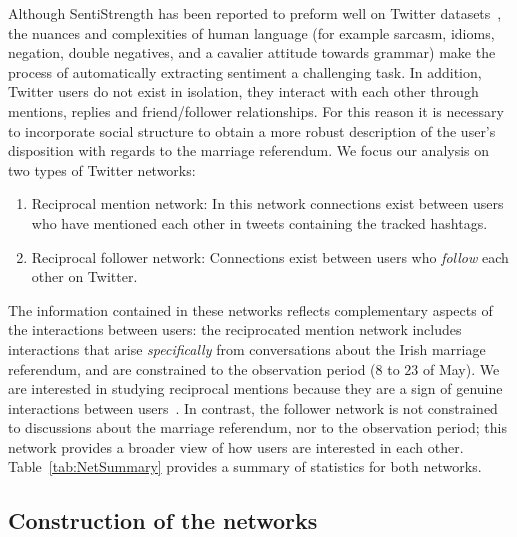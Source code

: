 \documentclass{article}
\begin{document}
Although SentiStrength has been reported to preform well on Twitter
datasets~\cite{Thelwall2013SentiStrHeart}, the nuances and
complexities of human language (for example sarcasm, idioms, negation,
double negatives, and a cavalier attitude towards grammar) make the process
of automatically extracting sentiment a challenging task. In addition,
Twitter users do not exist in isolation, they interact with each other
through mentions, replies and friend/follower relationships. For this
reason it is necessary to incorporate social structure to obtain a
more robust description of the user's disposition with regards to the
marriage referendum. We focus our analysis on two types of Twitter
networks:
\begin{enumerate}
\item Reciprocal mention network: In this network connections exist
  between users who have mentioned each other in tweets containing the
  tracked hashtags.
\item Reciprocal follower network: Connections exist between users who
  {\it follow} each other on Twitter.
\end{enumerate}
The information contained in these networks reflects complementary
aspects of the interactions between users: the reciprocated mention
network includes interactions that arise {\it specifically} from
conversations about the Irish marriage referendum, and are constrained
to the observation period ($8$ to $23$ of May). We are interested in
studying reciprocal mentions because they are a sign of genuine
interactions between
users~\cite{Charlton2016InTheMood,Grindrod150526}. In contrast, the
follower network is not constrained to discussions about the marriage
referendum, nor to the observation period; this network provides a
broader view of how users are interested in each
other. Table~\ref{tab:NetSummary} provides a summary of statistics for
both networks.

\subsection{Construction of the networks}
\end{document}
